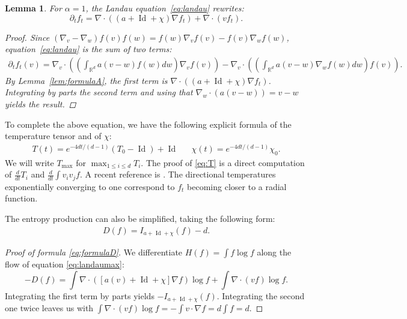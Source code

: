 \documentclass[11pt,a4paper]{article}
\theoremstyle{definition}
\theoremstyle{plain}
\newtheorem{lemma}[defi]{Lemma}
\DeclareMathOperator*{\Id}{Id}
\begin{document}
\begin{lemma}
\label{lem:linearlandau}
For $\alpha=1$, the Landau equation~\eqref{eq:landau} rewrites:
\begin{equation}
    \label{eq:landaumax}
    \partial_t f_t = \nabla \cdot\left( (a + \Id + \chi) \nabla f_t \right) + \nabla \cdot(vf_t).
\end{equation}
\begin{proof}
    Since $(\nabla_v - \nabla_w)f(v)f(w) = f(w) \nabla_v f (v) -f(v) \nabla_w f(w)$, equation~\eqref{eq:landau} is the sum of two terms:
    \begin{align*}
        \partial_t f_t(v) = \nabla_v \! \cdot\!\left(  \left(\int_{\mathbb{R}^{d}} a(v-w) f(w)dw\right)\nabla_v f (v)\right)-\nabla_v \! \cdot\! \left( \left(\int_{\mathbb{R}^{d}} a(v-w)\nabla_w f(w) dw\right) f(v)\right). 
    \end{align*}
    By Lemma~\ref{lem:formulaA}, the first term is $\nabla \cdot\left( (a + \Id + \chi) \nabla f_t \right)$. Integrating by parts the second term and using that $\nabla_w\cdot (a(v-w))= v-w$ yields the result.
\end{proof}
\end{lemma}
To complete the above equation, we have the following explicit formula of the temperature tensor and of $\chi$:
\begin{align}
\label{eq:T}
    T(t) = e^{-4dt/(d-1)} (T_0-\Id)+\Id && \chi(t)=e^{-4dt/(d-1)}\chi_0.
\end{align}
We will write $T_{\max}$ for $\max_{1\leq i\leq d} T_i$. The proof of \eqref{eq:T} is a direct computation of $\frac{d}{dt}T_i$ and $\frac{d}{dt}\int v_iv_jf$. A recent reference is \cite[Proposition 2]{Caja-LopezDelgadinoGualdani2025}. The directional temperatures exponentially converging to one correspond to $f_t$ becoming closer to a radial function.

The entropy production can also be simplified, taking the following form:
\begin{align}
\label{eq:formulaD}
    D(f)= I_{a+\Id+\chi}(f) - d.
\end{align}
\begin{proof}[Proof of formula \eqref{eq:formulaD}]
    We differentiate $H(f)=\int f \log f$ along the flow of equation \eqref{eq:landaumax}:
    $$-D(f)=\int \nabla \cdot \left(\left[ a(v)+\Id +\chi \right] \nabla f\right)\log f +\int \nabla\cdot (vf)\log f.  $$
    Integrating the first term by parts yields $-I_{a+\Id+\chi}(f)$. Integrating the second one twice leaves us with
    $\int \nabla\cdot (vf)\log f = -\int v\cdot \nabla f=d\int f=d.$
\end{proof}
\end{document}
